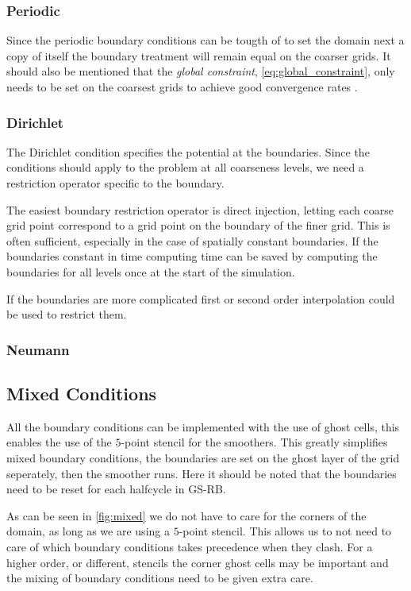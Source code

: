 	\subsubsection{Periodic}
		Since the periodic boundary conditions can be tougth of to set the domain next
		a copy of itself the boundary treatment will remain equal on the coarser
		grids. It should also be mentioned that the \textit{global constraint}, \cref{eq:global_constraint},
		only needs to be set on the coarsest grids to achieve good convergence
		rates \citep{trottenberg_multigrid_2000}.

	\subsubsection{Dirichlet}
		The Dirichlet condition specifies the potential at the boundaries. Since the conditions
		should apply to the problem at all coarseness levels, we need a restriction
		operator specific to the boundary.

		The easiest boundary restriction operator is direct injection, letting each
		coarse grid point correspond to a grid point on the boundary of the finer grid.
		This is often sufficient, especially in the case of spatially constant boundaries.
		If the boundaries constant in time computing time can be saved by computing the boundaries for all levels
		once at the start of the simulation.

		If the boundaries are more complicated first or second order interpolation
		could be used to restrict them.

	\subsubsection{Neumann}
		

	\subsection{Mixed Conditions}
		All the boundary conditions can be implemented with the use of ghost cells,
		this enables the use of the \(5\)-point stencil for the smoothers. This
		greatly simplifies mixed boundary conditions, the boundaries are set on the
		ghost layer of the grid seperately, then the smoother runs. Here it should
		be noted that the boundaries need to be reset for each halfcycle in GS-RB.

		As can be seen in \cref{fig:mixed} we do not have to care for the corners
		of the domain, as long as we are using a \(5\)-point stencil. This allows us to not
		need to care of which boundary conditions takes precedence when they clash.
		For a higher order, or different, stencils the corner ghost cells may be important
		and the mixing of boundary conditions need to be given extra care.

